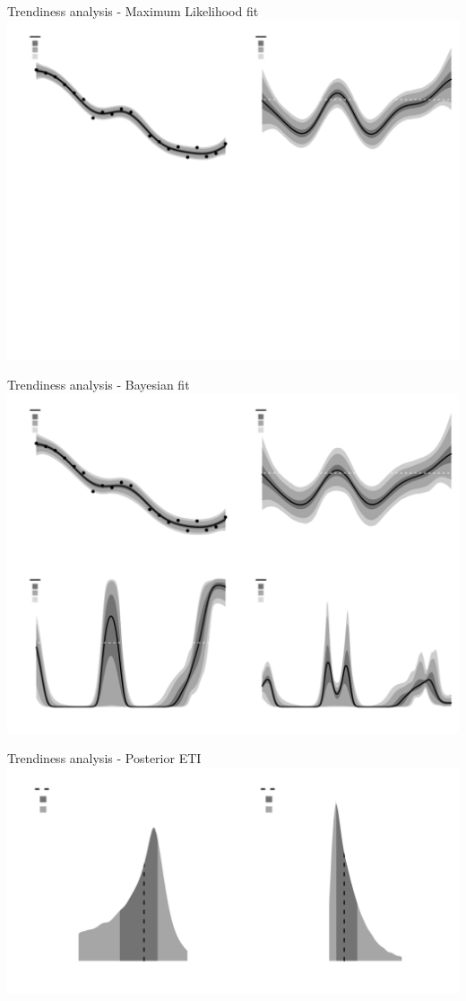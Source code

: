 \documentclass[ignorenonframetext,xcolor=pdflatex,table,dvipsnames,serif]{beamer}
\begin{document}
\begin{frame}{Trendiness analysis - Maximum Likelihood fit}
\center\includegraphics[scale=0.47]{fitLogLik}
\end{frame}

\begin{frame}{Trendiness analysis - Bayesian fit}
\center\includegraphics[scale=0.47]{fitBayes}	
\end{frame}

\begin{frame}{Trendiness analysis - Posterior ETI}
\center\includegraphics[scale=0.5]{ETIplot}	
\end{frame}
\end{document}
